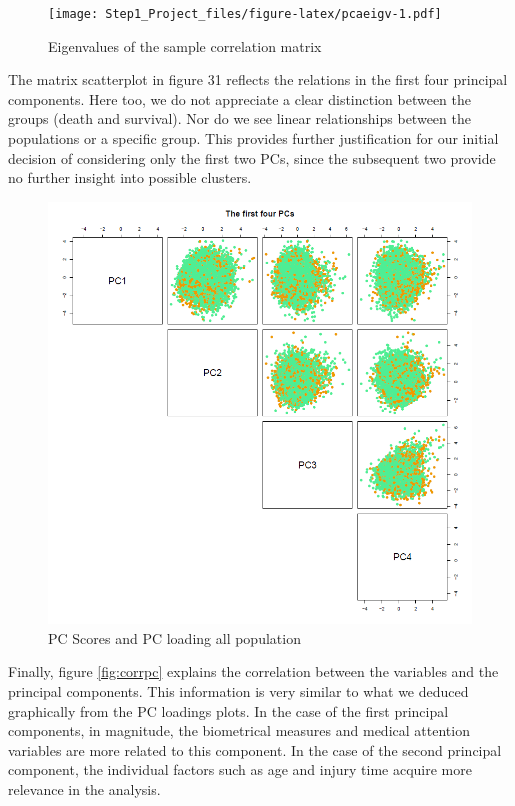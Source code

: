 \documentclass[
]{article}
\begin{document}
\begin{figure}
\centering
\texttt{[image: Step1\_Project\_files/figure-latex/pcaeigv-1.pdf]}
\caption{Eigenvalues of the sample correlation
matrix\label{fig:pcaeigv}}
\end{figure}

The matrix scatterplot in figure 31 reflects the relations in the first
four principal components. Here too, we do not appreciate a clear
distinction between the groups (death and survival). Nor do we see
linear relationships between the populations or a specific group. This
provides further justification for our initial decision of considering
only the first two PCs, since the subsequent two provide no further
insight into possible clusters.

\begin{figure}
\centering
\includegraphics{../figure_output/pca_4pc2.png}
\caption{PC Scores and PC loading all population}
\end{figure}

Finally, figure \ref{fig:corrpc} explains the correlation between the
variables and the principal components. This information is very similar
to what we deduced graphically from the PC loadings plots. In the case
of the first principal components, in magnitude, the biometrical
measures and medical attention variables are more related to this
component. In the case of the second principal component, the individual
factors such as age and injury time acquire more relevance in the
analysis.
\end{document}
